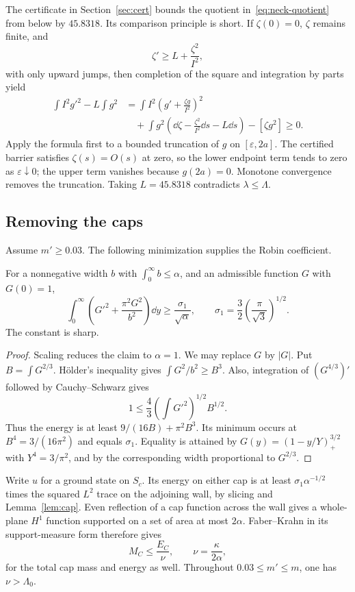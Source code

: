 The certificate in Section~\ref{sec:cert} bounds the quotient in~\eqref{eq:neck-quotient} from below by $45.8318$. Its comparison principle is short. If $\zeta(0)=0$, $\zeta$ remains finite, and
\[
 \zeta'\ge L+\frac{\zeta^2}{I^2},
\]
with only upward jumps, then completion of the square and integration by parts yield
\begin{align*}
 \int I^2g'^2-L\int g^2
 &=\int I^2\left(g'+\frac{\zeta g}{I^2}\right)^2\\
 &\quad+\int g^2\left(\dd\zeta-\frac{\zeta^2}{I^2}\dd s-L\dd s\right)
   -[\zeta g^2]\ge0.
\end{align*}
Apply the formula first to a bounded truncation of $g$ on $[\varepsilon,2a]$. The certified barrier satisfies $\zeta(s)=O(s)$ at zero, so the lower endpoint term tends to zero as $\varepsilon\downarrow0$; the upper term vanishes because $g(2a)=0$. Monotone convergence removes the truncation. Taking $L=45.8318$ contradicts $\lambda\le\Lambda$.

\subsection{Removing the caps}
Assume $m'\ge0.03$. The following minimization supplies the Robin coefficient.
\begin{lemma}\label{lem:cap}
For a nonnegative width $b$ with $\int_0^\infty b\le\alpha$, and an admissible function $G$ with $G(0)=1$,
\[
 \int_0^\infty\left(G'^2+\frac{\pi^2G^2}{b^2}\right)\dd y
 \ge\frac{\sigma_1}{\sqrt\alpha},\qquad
 \sigma_1=\frac32\left(\frac\pi{\sqrt3}\right)^{1/2}.
\]
The constant is sharp.
\end{lemma}
\begin{proof}
Scaling reduces the claim to $\alpha=1$. We may replace $G$ by $|G|$. Put $B=\int G^{2/3}$. H\"older's inequality gives $\int G^2/b^2\ge B^3$. Also, integration of $(G^{4/3})'$ followed by Cauchy--Schwarz gives
\[
 1\le\frac43\left(\int G'^2\right)^{1/2}B^{1/2}.
\]
Thus the energy is at least $9/(16B)+\pi^2B^3$. Its minimum occurs at $B^4=3/(16\pi^2)$ and equals $\sigma_1$. Equality is attained by $G(y)=(1-y/Y)_+^{3/2}$ with $Y^4=3/\pi^2$, and by the corresponding width proportional to $G^{2/3}$.
\end{proof}

Write $u$ for a ground state on $S_c$. Its energy on either cap is at least $\sigma_1\alpha^{-1/2}$ times the squared $L^2$ trace on the adjoining wall, by slicing and Lemma~\ref{lem:cap}. Even reflection of a cap function across the wall gives a whole-plane $H^1$ function supported on a set of area at most $2\alpha$. Faber--Krahn in its support-measure form therefore gives
\[
 M_C\le\frac{E_C}{\nu},\qquad \nu=\frac\kappa{2\alpha},
\]
for the total cap mass and energy as well. Throughout $0.03\le m'\le m$, one has $\nu>\Lambda_0$.


